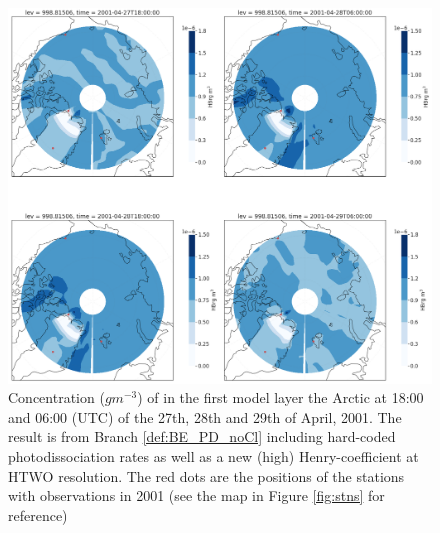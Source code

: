 \begin{figure}[h]
    \centering
    \includegraphics[width=\linewidth]{Chapter6_Results/images/polarHBr_HTWO_step3.png}
    \caption{Concentration ($g m^{-3}$) of  in the first model layer the Arctic at 18:00 and 06:00 (UTC) of the 27th, 28th and 29th of April, 2001. The result is from Branch \ref{def:BE_PD_noCl} including hard-coded photodissociation rates as well as a new (high) Henry-coefficient at HTWO resolution. The red dots are the positions of the stations with observations in 2001 (see the map in Figure \ref{fig:stns} for reference)}
    \label{fig:polarHBr_HTWO_step3}
\end{figure}